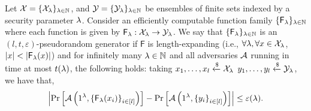 \begin{definition}
Let $\mathcal{X} = \{\mathcal{X}_\lambda\}_{\lambda \in \mathbb{N}}$, and $\mathcal{Y} = \{\mathcal{Y}_\lambda\}_{\lambda \in \mathbb{N}}$ be ensembles of finite sets indexed by a security parameter $\lambda$. Consider an efficiently computable function family $\{\mathsf{F}_\lambda\}_{\lambda \in \mathbb{N}}$ where each function is given by $\mathsf{F}_\lambda: \mathcal{X}_\lambda \to \mathcal{Y}_\lambda$.
We say that $\{\mathsf{F}_\lambda\}_{\lambda \in \mathbb{N}}$ is an $(l,t, \varepsilon)$-pseudorandom generator if $\mathsf{F}$ is length-expanding (i.e., $\forall \lambda, \forall x \in \mathcal{X}_\lambda$, $\left| {x} \right| < \left| {\mathsf{F}_\lambda(x)} \right|$) and for infinitely many $\lambda \in \mathbb{N}$ and all adversaries $\mathcal{A}$ running in time at most $t(\lambda)$, the following holds: taking $x_1, \dots, x_l \xleftarrow{\$} \mathcal{X}_\lambda$  $y_1, \dots, y_l \xleftarrow{\$} \mathcal{Y}_\lambda$, we have that,
\[
    \left|\Pr\left[ \mathcal{A}\left(1^\lambda, {\{\mathsf{F}_\lambda(x_i)\}}_{i \in [l]} \right)\right]
    - \Pr\left[ \mathcal{A}\left(1^\lambda, {\{y_i\}}_{i \in [l]}\right)\right] \right| \leq \varepsilon(\lambda).
\]
\end{definition}


